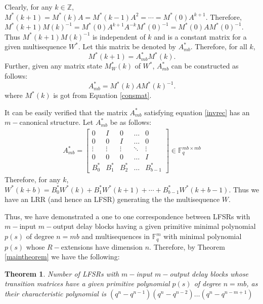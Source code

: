 \documentclass[letterpaper, 12 pt]{article}  \usepackage{amssymb}
\newtheorem{theorem}{Theorem}[section]
\newcommand{\F}{\mathbb{F}}
\begin{document}
Clearly, for any  $k \in \mathbb{Z}$, $M^*(k+1) = M^*(k)A = M^*(k-1)A^2 = \cdots
= M^*(0)A^{k+1}$. Therefore,
$M^*(k+1)M(k)^{-1} = M^*(0)A^{k+1}A^{-k}M^*(0)^{-1} = M^*(0)AM^*(0)^{-1}$. Thus
 $M^*(k+1)M(k)^{-1}$ is independent of $k$ and is a constant matrix for a given
multisequence $W^*$. Let this matrix be denoted by $A_{mb}^*$. Therefore, for
all $k$, 
\begin{equation}
 \label{invrec}
M^*(k+1) = A_{mb}^*M^*(k).
\end{equation}
Further, given any matrix state $M_W^*(k)$ of $W^*$, $A_{mb}^*$ can be
constructed as follows: 
\begin{equation}
 \label{invrec}
A_{mb}^* = M^*(k)AM^*(k)^{-1}.
\end{equation}
where $M^*(k)$ is got from Equation \eqref{consmat}.

It can be easily verified that the matrix $A_{mb}^*$ satisfying equation
\eqref{invrec} has an $m-$canonical structure. Let $A_{mb}^*$ be as follows: 
\begin{eqnarray*}
A_{mb}^* = \left[
\begin{matrix}
 0 & I & 0 & \ldots & 0 \\
 0 & 0 & I & \ldots & 0   \\
\vdots & \vdots & \vdots & \ddots & \vdots  \\
0 & 0 & 0 & \ldots & I  \\
B_0^*&B_1^*&B_2^*& \ldots & B_{b-1}^*
 \end{matrix}
\right] \in \F_q^{mb \times mb}
\end{eqnarray*}
Therefore, for any $k$, $W^*(k+b) = B_0^*W^*(k) + B_1^*W^*(k+1) + \cdots +
B_{b-1}^*W^*(k+b-1)$. Thus we have an LRR (and hence an LFSR) generating the  
the multisequence $W$.

Thus, we have demonstrated a one to one correspondence between LFSRs with
$m-$input $m-$output delay blocks having a given primitive minimal polynomial
$p(s)$ of degree $n=mb$ and multisequences in $\F_q^m$ with minimal polynomial
$p(s)$ whose $R-$extensions have dimension $n$. Therefore, by Theorem
\ref{maintheorem} we have the following:

\begin{theorem}
Number of LFSRs with $m-$input $m-$output delay blocks whose transition
matrices have a given primitive polynomial $p(s)$ of degree $n=mb$, as their
characteristic polynomial is
$(q^{n}-q^{n-1})(q^{n}-q^{n-2})\ldots(q^{n}-q^{n-m+1})$
\end{theorem}
\end{document}
